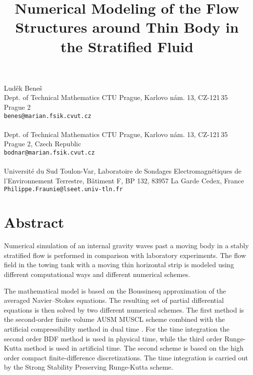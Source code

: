 \title{Numerical Modeling of the Flow Structures around Thin Body in  the  Stratified Fluid}
 \author{} \institute{}
\maketitle
\begin{center}
{\large Lud\v{e}k Bene\v{s}}\\
Dept. of Technical Mathematics CTU Prague, Karlovo   n\'{a}m. 13, CZ-121\,35 Prague 2\\
{\tt benes@marian.fsik.cvut.cz}
\\ \\
Dept. of Technical Mathematics CTU Prague, Karlovo   n\'{a}m. 13, CZ-121\,35 Prague 2, Czech Republic\\
{\tt bodnar@marian.fsik.cvut.cz}
\\ \\
Universit\'{e} du Sud Toulon-Var, Laboratoire de Sondages Electromagn\'{e}tiques de l'Environnement Terrestre, B\^{a}timent F, BP 132, 83957 La Garde Cedex, France\\
{\tt Philippe.Fraunie@lseet.univ-tln.fr}

\end{center}

\section*{Abstract}

 Numerical simulation of an internal gravity waves past a moving body in a
 stably stratified flow is performed in   comparison with  laboratory
  experiments. The flow field in the towing tank  with a moving thin
  horizontal strip is modeled using different computational ways and
   different numerical schemes. 

The  mathematical model is based on the 
Boussinesq approximation of the averaged Navier--Stokes equations.  The
resulting set of partial 
differential equations is then solved  by two different numerical schemes. The
first method is the second-order finite volume AUSM MUSCL scheme
combined with the artificial compressibility method in dual time . For the
time integration the second order BDF method is used in physical time, while
the third order Runge-Kutta method is used in artificial time. The second
scheme is based on the high order compact finite-difference discretizations.
The time integration is carried out by the Strong Stability Preserving
Runge-Kutta scheme. 


